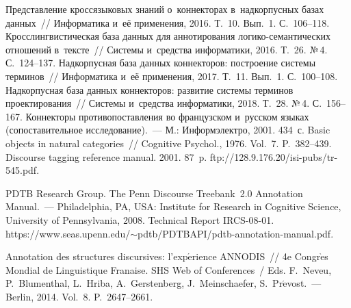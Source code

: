 \begin{multicols}{2}
\vspace*{-6pt}
   
  {\small\frenchspacing
 {%
 \begin{thebibliography}{99}
 
\vspace*{-3pt}

 Представление 
кроссязыковых знаний о~коннекторах в~надкорпусных базах данных~// Информатика и~её 
применения, 2016. Т.~10. Вып.~1. С.~106--118.
 Кросс\-линг\-ви\-сти\-че\-ская база данных 
для аннотирования ло\-ги\-ко-се\-ман\-ти\-че\-ских отношений в~тексте~// Сис\-те\-мы и~средства 
информатики, 2016. Т.~26. №\,4. С.~124--137.
 Надкорпусная база данных 
коннекторов: построение сис\-те\-мы терминов~// Информатика и~её применения, 2017. 
Т.~11. Вып.~1. С.~100--108.
 Надкорпусная база данных коннекторов: развитие 
системы терминов проектирования~// Системы и~средства информатики, 2018. Т.~28. 
№\,4. С.~156--167.
 Коннекторы противопоставления во французском 
и~русском языках (сопоставительное исследование).~--- М.: Информэлектро, 2001. 434~с. 
 Basic objects in 
natural categories~// Cognitive Psychol., 1976. Vol.~7. P.~382--439.
 Discourse tagging reference manual. 2001.  87~p. 
{\sf  ftp://128.9.176.20/isi-pubs/tr-545.pdf}. 

PDTB Research Group. The Penn Discourse Treebank~2.0 Annotation Manual.~--- 
Philadelphia, PA, USA: Institute for Research in Cognitive Science, University of 
Pennsylvania, 2008. Technical 
Report IRCS-08-01. {\sf  
https://www.seas.upenn.edu/$\sim$pdtb/PDTBAPI/pdtb-annotation-manual.pdf}.

 Annotation des structures 
discursives: l'exp$\acute{\mbox{e}}$rience ANNODIS~// 
4e Congr$\grave{\mbox{e}}$s Mondial de Linguistique 
\mbox{Fran{\normalsize\!}aise}. SHS Web of Conferences~/ Eds.
F.~Neveu, P.~Blumenthal, L.~Hriba, A.~Gerstenberg, J.~Meinschaefer, 
S.~Pr$\acute{\mbox{e}}$vost.~--- Berlin, 2014. Vol.~8. P.~2647--2661.


\end{thebibliography}}}
\end{multicols}
